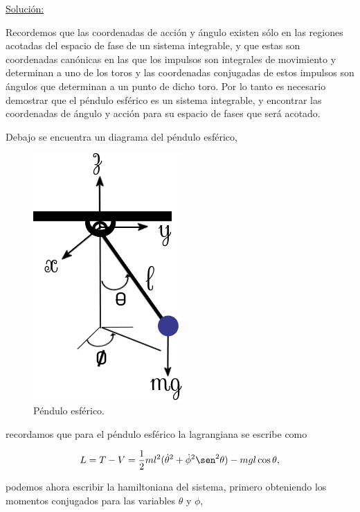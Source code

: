 \documentclass[a4paper,10pt]{article}
\numberwithin{equation}{section}
\begin{document}
\vspace{.3cm}

\underline{Solución:} \vspace{.3cm}

Recordemos que las coordenadas de acción y ángulo existen sólo en las regiones 
acotadas del espacio de fase de un sistema integrable, y que estas son 
coordenadas canónicas en las que los impulsos son integrales de movimiento y 
determinan a uno de los toros y las coordenadas conjugadas de estos impulsos 
son ángulos que determinan a un punto de dicho toro. Por lo tanto es necesario 
demostrar que el péndulo esférico es un sistema integrable, y encontrar las 
coordenadas de ángulo y acción para su espacio de fases que será acotado. 

\vspace{.3cm}

Debajo se encuentra un diagrama del péndulo esférico,

\begin{figure}[H]
 \center 
 \includegraphics[scale=0.6]{problema2fig1}
 \caption{Péndulo esférico.}
 \label{fig:problema2fig1}
\end{figure}

recordamos que para el péndulo esférico la lagrangiana se escribe como 

\begin{equation}
 L = T - V = \frac{1}{2}ml^2(\dot{\theta}^2 + \dot{\phi}^2\sen^2{\theta}) 
 - mgl\cos{\theta},
\end{equation}

podemos ahora escribir la hamiltoniana del sistema, primero obteniendo los momentos 
conjugados para las variables $\theta$ y $\phi$, 
\end{document}
